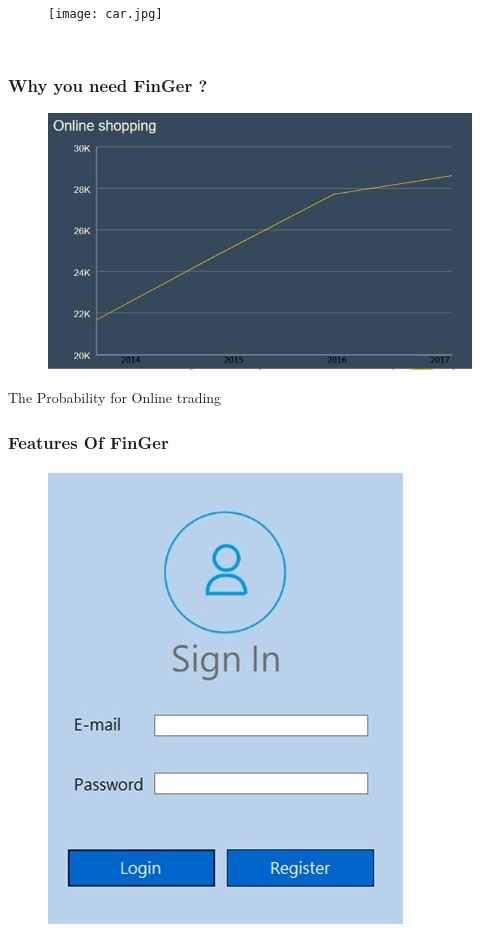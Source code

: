 \documentclass{beamer}
\begin{document}
\begin{CJK}{UTF8}{bsmi}
\begin{frame}
\begin{columns}[c]

\begin{figure}
\texttt{[image: car.jpg]}
\end{figure}

\end{columns}


\end{frame}


\begin{frame}
\frametitle{Why you need FinGer ?}

\begin{figure}
\includegraphics[width=0.8\linewidth]{online.jpg}
\end{figure}
\begin{center}
The Probability for Online trading
\end{center}

\end{frame}


\begin{frame}
\frametitle{Features Of FinGer}

\begin{figure}
\includegraphics[width=0.4\linewidth]{signin.jpg}
\end{figure}


\end{frame}
\end{CJK}
\end{document}
